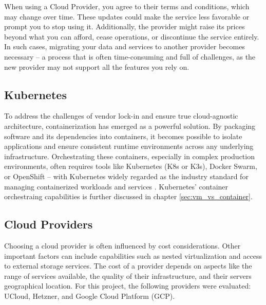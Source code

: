 When using a Cloud Provider, you agree to their terms and conditions, which may change over time. These updates could make the service less favorable or prompt you to stop using it. Additionally, the provider might raise its prices beyond what you can afford, cease operations, or discontinue the service entirely. In such cases, migrating your data and services to another provider becomes necessary -- a process that is often time-consuming and full of challenges, as the new provider may not support all the features you rely on.

\subsection{Kubernetes}

To address the challenges of vendor lock-in and ensure true cloud-agnostic architecture, containerization has emerged as a powerful solution. By packaging software and its dependencies into containers, it becomes possible to isolate applications and ensure consistent runtime environments across any underlying infrastructure. Orchestrating these containers, especially in complex production environments, often requires tools like Kubernetes (K8s or K3s), Docker Swarm, or OpenShift -- with Kubernetes widely regarded as the industry standard for managing containerized workloads and services \Parencite{opsramp_kubernetes_origin}. Kubernetes' container orchestraing capabilities is further discussed in chapter \ref{sec:vm_vs_container}.

\subsection{Cloud Providers}\label{sec:cloud_providers}

Choosing a cloud provider is often influenced by cost considerations. Other important factors can include capabilities such as nested virtualization and access to external storage services. The cost of a provider depends on aspects like the range of services available, the quality of their infrastructure, and their servers geographical location. For this project, the following providers were evaluated: UCloud, Hetzner, and Google Cloud Platform (GCP).


